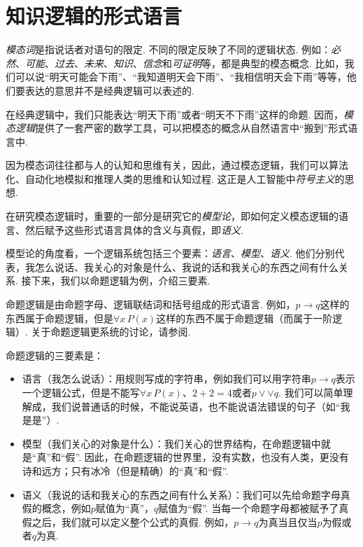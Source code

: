 \section{知识逻辑的形式语言}

\textit{模态词}是指说话者对语句的限定. 不同的限定反映了不同的逻辑状态. 例如：\textit{必然}、\textit{可能}、\textit{过去}、\textit{未来}、\textit{知识}、\textit{信念}和\textit{可证明}等，都是典型的模态概念. 比如，我们可以说“明天可能会下雨”、“我知道明天会下雨”、“我相信明天会下雨”等等，他们要表达的意思并不是经典逻辑可以表述的. 

在经典逻辑中，我们只能表达“明天下雨”或者“明天不下雨”这样的命题. 因而，\textit{模态逻辑}提供了一套严密的数学工具，可以把模态的概念从自然语言中“搬到”形式语言中. 

因为模态词往往都与人的认知和思维有关，因此，通过模态逻辑，我们可以算法化、自动化地模拟和推理人类的思维和认知过程. 这正是人工智能中\textit{符号主义}的思想. 

在研究模态逻辑时，重要的一部分是研究它的\textit{模型论}，即如何定义模态逻辑的语言、然后赋予这些形式语言具体的含义与真假，即\textit{语义}. 

模型论的角度看，一个逻辑系统包括三个要素：\textit{语言}、\textit{模型}、\textit{语义}. 他们分别代表，我怎么说话、我关心的对象是什么、我说的话和我关心的东西之间有什么关系. 接下来，我们以命题逻辑为例，介绍三要素. 

\begin{example}[命题逻辑的逻辑三要素]
命题逻辑是由命题字母、逻辑联结词和括号组成的形式语言. 例如，$p\to q$这样的东西属于命题逻辑，但是$\forall x\, P(x)$这样的东西不属于命题逻辑（而属于一阶逻辑）. 关于命题逻辑更系统的讨论，请参阅. 

命题逻辑的三要素是：

\begin{itemize}
    \item 语言（我怎么说话）：用规则写成的字符串，例如我们可以用字符串$p\to q$表示一个逻辑公式，但是不能写$\forall x\, P(x)$、$2+2=4$或者$p\vee\vee q$. 我们可以简单理解成，我们说普通话的时候，不能说英语，也不能说语法错误的句子（如“我是是”）. 
    \item 模型（我们关心的对象是什么）：我们关心的世界结构，在命题逻辑中就是“真”和“假”. 因此，在命题逻辑的世界里，没有实数，也没有人类，更没有诗和远方；只有冰冷（但是精确）的“真”和“假”. 
    \item 语义（我说的话和我关心的东西之间有什么关系）：我们可以先给命题字母真假的概念，例如$p$赋值为“真”，$q$赋值为“假”. 当每一个命题字母都被赋予了真假之后，我们就可以定义整个公式的真假. 例如，$p\to q$为真当且仅当$p$为假或者$q$为真. 
\end{itemize}
\end{example}

